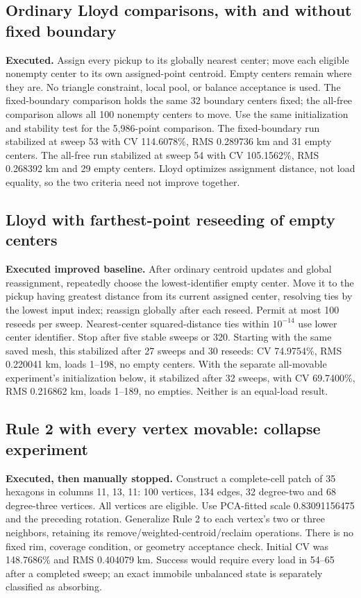 \documentclass[11pt]{article}
\begin{document}
\subsection{Ordinary Lloyd comparisons, with and without fixed boundary}
\textbf{Executed.} Assign every pickup to its globally nearest center; move each
eligible nonempty center to its own assigned-point centroid. Empty centers
remain where they are. No triangle constraint, local pool, or balance acceptance
is used. The fixed-boundary comparison holds the same 32 boundary centers fixed;
the all-free comparison allows all 100 nonempty centers to move. Use the same
initialization and stability test for the 5,986-point comparison.
The fixed-boundary run stabilized at sweep 53 with CV 114.6078\%, RMS
0.289736 km and 31 empty centers. The all-free run stabilized at sweep 54 with
CV 105.1562\%, RMS 0.268392 km and 29 empty centers. Lloyd optimizes assignment
distance, not load equality, so the two criteria need not improve together.

\subsection{Lloyd with farthest-point reseeding of empty centers}
\textbf{Executed improved baseline.} After ordinary centroid updates and global
reassignment, repeatedly choose the lowest-identifier empty center. Move it to
the pickup having greatest distance from its current assigned center, resolving
ties by the lowest input index; reassign globally after each reseed. Permit at
most 100 reseeds per sweep. Nearest-center squared-distance ties within
$10^{-14}$ use lower center identifier. Stop after five stable sweeps or 320.
Starting with the same saved mesh, this stabilized after 27 sweeps and 30 reseeds:
CV 74.9754\%, RMS 0.220041 km, loads 1--198, no empty centers.
With the separate all-movable experiment's initialization below, it stabilized
after 32 sweeps, with CV 69.7400\%, RMS 0.216862 km, loads 1--189, no empties.
Neither is an equal-load result.

\subsection{Rule 2 with every vertex movable: collapse experiment}
\textbf{Executed, then manually stopped.}
Construct a complete-cell patch of 35 hexagons in columns 11, 13, 11: 100
vertices, 134 edges, 32 degree-two and 68 degree-three vertices. All vertices
are eligible. Use PCA-fitted scale 0.83091156475 and the preceding rotation.
Generalize Rule 2 to each vertex's two or three neighbors, retaining its
remove/weighted-centroid/reclaim operations. There is no fixed rim, coverage
condition, or geometry acceptance check. Initial CV was 148.7686\% and RMS
0.404079 km. Success would require every load in 54--65 after a completed sweep;
an exact immobile unbalanced state is separately classified as absorbing.
\end{document}
